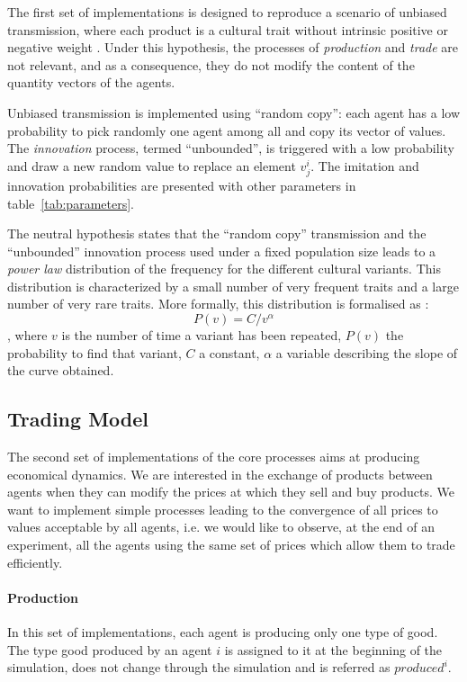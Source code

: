 \documentclass{wscpaperproc}
\begin{document}
The first set of implementations is designed to reproduce a scenario of unbiased transmission, where each product is a cultural trait without intrinsic positive or negative weight . 
Under this hypothesis, the processes of \emph{production} and \emph{trade} are not relevant, and as a consequence, they do not modify the content of the quantity vectors of the agents.

Unbiased transmission is implemented using ``random copy'': each agent has a low probability to pick randomly one agent among all and copy its vector of values. The \emph{innovation} process, termed ``unbounded'', is triggered with a low probability and draw a new random value to replace an element $v^i_j$. The imitation and innovation probabilities are presented with other parameters in table~\ref{tab:parameters}.

The neutral hypothesis states that the ``random copy'' transmission and the ``unbounded'' innovation process used under a fixed population size leads to a \emph{power law} distribution of the frequency for the different cultural variants. This distribution is characterized by a small number of very frequent traits and a large number of very rare traits. 
More formally, this distribution is formalised as : $$P(v)=C/v^\alpha $$, where $v$ is the number of time a variant has been repeated, $P(v)$ the probability to find that variant, $C$ a constant, $\alpha$ a variable describing the slope of the curve obtained. 

\subsection{Trading Model}\label{sec:trade}

The second set of implementations of the core processes aims at producing economical dynamics. We are interested in the exchange of products between agents when they can modify the prices at which they sell and buy products. We want to implement simple processes leading to the convergence of all prices to values acceptable by all agents, i.e. we would like to observe, at the end of an experiment, all the agents using the same set of prices which allow them to trade efficiently.

\paragraph{Production}
In this set of implementations, each agent is producing only one type of good. The type good produced by an agent $i$ is assigned to it at the beginning of the simulation, does not change through the simulation and is referred as $produced^i$. 
\end{document}

